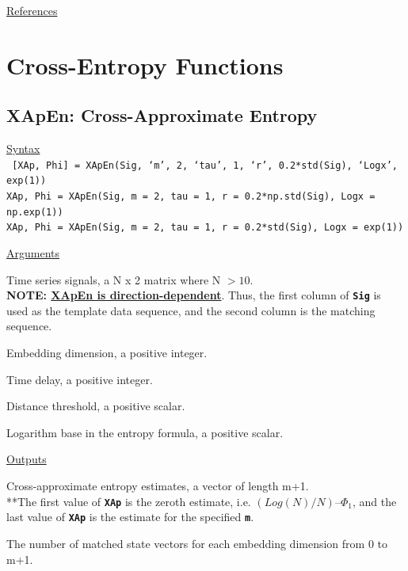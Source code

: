 \documentclass[12pt, a4paper, titlepage, openany]{book}
\begin{document}
\noindent \ul{References}\hspace{1cm}
\cite{Attn1}



\newpage
\section{Cross-Entropy Functions}
\vspace{1cm}

\subsection{\normalsize XApEn: \hspace{15mm} Cross-Approximate Entropy}
\noindent\ul{Syntax} \vspace{6mm} \\ \noindent \texttt{\footnotesize
[XAp, Phi] = XApEn(Sig, ‘m’, 2, ‘tau’, 1, ‘r’, 0.2*std(Sig), ‘Logx’, exp(1))\\
 XAp, Phi  = XApEn(Sig, m = 2, tau = 1, r = 0.2*np.std(Sig), Logx = np.exp(1))\\
 XAp, Phi  = XApEn(Sig, m = 2, tau = 1, r = 0.2*std(Sig), Logx = exp(1))}

\noindent \ul{Arguments}
\begin{description}[labelsep=1cm, labelwidth=2cm, nosep,,style=multiline,leftmargin=3cm]\footnotesize
\item[\texttt{Sig}]		Time series signals, a N x 2 matrix where N $> 10$.\\
\textbf{NOTE: \ul{XApEn is direction-dependent}}. Thus, the first column of \texttt{\textbf{Sig}} is used as the template data sequence, and the second column is the matching sequence.
\item[\texttt{m}]		Embedding dimension, a positive integer.
\item[\texttt{tau}]		Time delay, a positive integer.
\item[\texttt{r}]		Distance threshold, a positive scalar.
\item[\texttt{Logx}]	Logarithm base in the entropy formula, a positive scalar.
\end{description}

\noindent \ul{Outputs}
\begin{description}[labelsep=1cm, labelwidth=2cm, nosep, style=multiline,leftmargin=3cm]\footnotesize
\item[\texttt{XAp}]		Cross-approximate entropy estimates, a vector of length m+1.\\
		**The first value of \texttt{\textbf{XAp}} is the zeroth estimate, i.e. $(Log(N)/N) – \Phi_1$,
						and the last value of \texttt{\textbf{XAp}} is the estimate for the specified \texttt{\textbf{m}}.
\item[\texttt{Phi}]		The number of matched state vectors for each embedding dimension from 0 to m+1.
\end{description}
\end{document}
